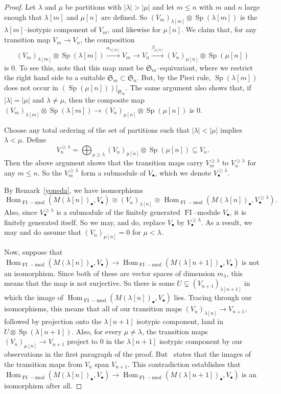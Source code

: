 \documentclass[10pt]{amsart}
\DeclareMathOperator{\FI}{FI}
\DeclareMathOperator{\Hom}{Hom}
\DeclareMathOperator{\Sp}{Sp}
\newcommand{\Sn}{\mathfrak{S}}
\newcommand{\dt}{\bullet}
\theoremstyle{definition}
\begin{document}
\begin{proof} Let $\lambda$ and $\mu$ be partitions with $|\lambda| > |\mu|$ and let $m \leq n$ with $m$ and $n$ large enough that $\lambda[m]$ and $\mu[n]$ are defined. 
So $(V_m)_{\lambda[m]} \otimes \Sp(\lambda[m])$ is the $\lambda[m]$--isotypic component of $V_m$, and likewise for $\mu[n]$. 
We claim that, for any transition map $V_m \to V_n$, the composition 
\[ (V_m)_{\lambda[m]} \otimes \Sp(\lambda[m]) \stackrel{\alpha_{\lambda[m]}}{\longrightarrow} V_m \to V_n \stackrel{\beta_{\mu[n]}}{\longrightarrow} (V_n)_{\mu[n]} \otimes \Sp(\mu[n]) \]
is $0$. To see this, note that this map must be $\Sn_m$--equivariant, where we restrict the right hand side to a suitable $\Sn_m \subset \Sn_n$. 
But, by the Pieri rule, $\Sp(\lambda[m])$ does not occur in $\left. \left( \Sp(\mu[n]) \right)\right|_{\Sn_m}$.
The same argument also shows that, if $|\lambda| = |\mu|$ and $\lambda \neq \mu$, then the composite map $ (V_m)_{\lambda[m]} \otimes \Sp(\lambda[m]) \longrightarrow (V_n)_{\mu[n]} \otimes \Sp(\mu[n])$ is $0$. 

Choose any total ordering of the set of partitions such that $|\lambda| < |\mu|$ implies $\lambda < \mu$. Define
\[ V_n^{\geq \lambda} = \bigoplus_{\mu \geq \lambda} (V_n)_{\mu[n]} \otimes \Sp(\mu[n]) \subseteq V_n . \]
Then the above argument shows that the transition maps carry $V_m^{\geq \lambda}$ to $V_n^{\geq \lambda}$ for any $m \leq n$. 
So the $V_m^{\geq \lambda}$ form a submodule of $V_{\dt}$, which we denote $V_{\dt}^{\geq \lambda}$. 

By Remark~\ref{yoneda}, we have isomorphisms $$\Hom_{\FI-\text{mod}}(M(\lambda[n])_\dt, V_\dt) \cong (V_n)_{\lambda[n]} \cong \Hom_{\FI-\text{mod}}(M(\lambda[n])_\dt, V^{\geq \lambda}_\dt).$$ Also, since $V_{\dt}^{\geq \lambda}$ is a submodule of the finitely generated $\FI$--module $V_{\dt}$, it is finitely generated itself. So we may, and do, replace $V_\dt$ by $V^{\geq \lambda}_\dt$. As a result, we may and do assume that $(V_n)_{\mu[n]}=0$ for $\mu < \lambda$.

Now, suppose that $\Hom_{\FI-\text{mod}}(M(\lambda[n])_\dt, V_\dt) \to \Hom_{\FI-\text{mod}}(M(\lambda[n+1])_\dt, V_\dt)$ is not an isomorphism. Since both of these are vector spaces of dimension $m_{\lambda}$, this means that the map is not surjective. So there is some $U \subsetneq (V_{n+1})_{\lambda[n+1]}$ in which the image of $\Hom_{\FI-\text{mod}}(M(\lambda[n])_\dt, V_\dt)$ lies. Tracing through our isomorphisms, this means that all of our transition maps $(V_n)_{\lambda[n]} \to V_{n+1}$, followed by projection onto the $\lambda[n+1]$ isotypic component, land in $U \otimes \Sp(\lambda[n+1])$. Also, for every $\mu \neq \lambda$, the transition maps $(V_n)_{\mu[n]} \to V_{n+1}$ project to $0$ in the $\lambda[n+1]$ isotypic component by our observations in the first paragraph of the proof. But~\cite[Proposition~3.3.3]{CEF} states that the images of the transition maps from $V_n$ span $V_{n+1}$. This contradiction establishes that $\Hom_{\FI-\text{mod}}(M(\lambda[n])_\dt, V_\dt) \to \Hom_{\FI-\text{mod}}(M(\lambda[n+1])_\dt, V_\dt)$ is an isomorphism after all.
\end{proof}
\end{document}
